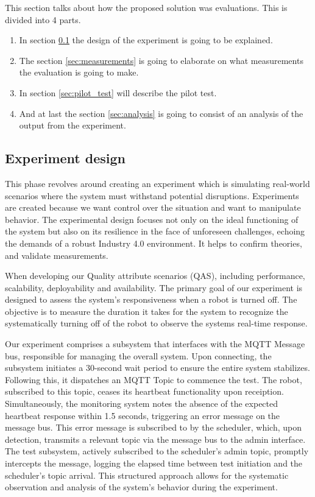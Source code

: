 
This section talks about how the proposed solution was evaluations. This is divided into 4 parts.
\begin{enumerate}
    \item In section \ref{sec:design} the design of the experiment is going to be explained. 
    \item The section \ref{sec:measurements} is going to elaborate on what measurements the evaluation is going to make.
    \item In section \ref{sec:pilot_test} will describe the pilot test.
    \item And at last the section \ref{sec:analysis} is going to consist of an analysis of the output from the experiment.
\end{enumerate}


\subsection{Experiment design}
\label{sec:design}
This phase revolves around creating an experiment which is simulating real-world scenarios where the system must withstand potential disruptions. Experiments are created because we want control over the situation and want to manipulate behavior. The experimental design focuses not only on the ideal functioning of the system but also on its resilience in the face of unforeseen challenges, echoing the demands of a robust Industry 4.0 environment. It helps to confirm theories, and validate measurements. 

When developing our Quality attribute scenarios (QAS), including performance, scalability, deployability and availability.
The primary goal of our experiment is designed to assess the system's responsiveness when a robot is turned off. The objective is to measure the duration it takes for the system to recognize the systematically turning off of the robot to observe the systems real-time response. 

Our experiment comprises a subsystem that interfaces with the MQTT Message bus, responsible for managing the overall system. Upon connecting, the subsystem initiates a 30-second wait period to ensure the entire system stabilizes. Following this, it dispatches an MQTT Topic to commence the test.
The robot, subscribed to this topic, ceases its heartbeat functionality upon receiption. Simultaneously, the monitoring system notes the absence of the expected heartbeat response within 1.5 seconds, triggering an error message on the message bus. This error message is subscribed to by the scheduler, which, upon detection, transmits a relevant topic via the message bus to the admin interface.
The test subsystem, actively subscribed to the scheduler's admin topic, promptly intercepts the message, logging the elapsed time between test initiation and the scheduler's topic arrival. This structured approach allows for the systematic observation and analysis of the system's behavior during the experiment. 



